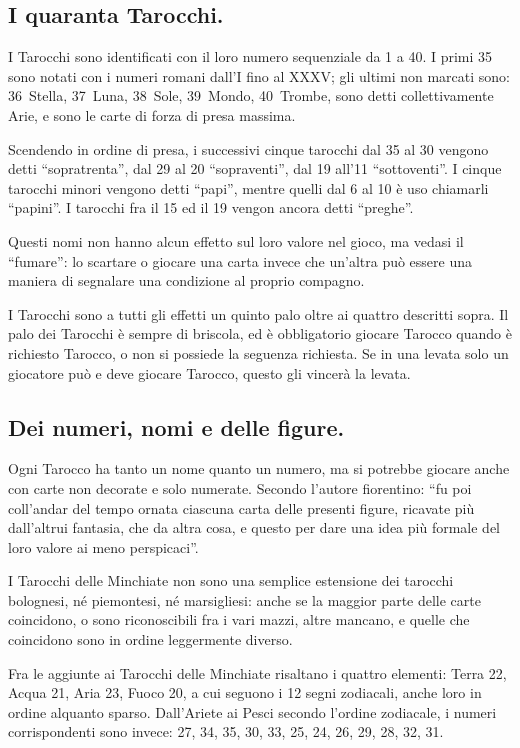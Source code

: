 \documentclass[11pt,a6paper]{article}
\begin{document}
\subsection{I quaranta Tarocchi.}

I Tarocchi sono identificati con il loro numero sequenziale da 1 a 40.  I
primi 35 sono notati con i numeri romani dall'I fino al \mbox{XXXV}; gli ultimi non
marcati sono: 36~Stella, 37~Luna, 38~Sole, 39~Mondo, 40~Trombe, sono detti
collettivamente Arie, e sono le carte di forza di presa massima.

Scendendo in ordine di presa, i successivi cinque tarocchi dal 35 al 30
vengono detti ``sopratrenta'', dal 29 al 20 ``sopraventi'', dal 19 all'11
``sottoventi''. I cinque tarocchi minori vengono detti ``papi'', mentre
quelli dal 6 al 10 è uso chiamarli ``papini''. I tarocchi fra il 15 ed il 19
vengon ancora detti ``preghe''.

Questi nomi non hanno alcun effetto sul loro valore nel gioco, ma vedasi il
``fumare'': lo scartare o giocare una carta invece che un'altra può essere
una maniera di segnalare una condizione al proprio compagno.

I Tarocchi sono a tutti gli effetti un quinto palo oltre ai quattro
descritti sopra. Il palo dei Tarocchi è sempre di briscola, ed è
obbligatorio giocare Tarocco quando è richiesto Tarocco, o non si possiede
la seguenza richiesta.  Se in una levata solo un giocatore può e deve
giocare Tarocco, questo gli vincerà la levata.

\subsection{Dei numeri, nomi e delle figure.}

Ogni Tarocco ha tanto un nome quanto un numero, ma si potrebbe giocare anche
con carte non decorate e solo numerate. Secondo l'autore fiorentino: ``fu
poi coll'andar del tempo ornata ciascuna carta delle presenti figure,
ricavate più dall'altrui fantasia, che da altra cosa, e questo per dare una
idea più formale del loro valore ai meno perspicaci''.

I Tarocchi delle Minchiate non sono una semplice estensione dei tarocchi
bolognesi, né piemontesi, né marsigliesi: anche se la maggior parte delle
carte coincidono, o sono riconoscibili fra i vari mazzi, altre mancano, e
quelle che coincidono sono in ordine leggermente diverso.

Fra le aggiunte ai Tarocchi delle Minchiate risaltano i quattro elementi:
Terra 22, Acqua 21, Aria 23, Fuoco 20, a cui seguono i 12 segni zodiacali,
anche loro in ordine alquanto sparso.  Dall'Ariete ai Pesci secondo l'ordine
zodiacale, i numeri corrispondenti sono invece: 27, 34, 35, 30, 33, 25, 24,
26, 29, 28, 32, 31.
\end{document}
